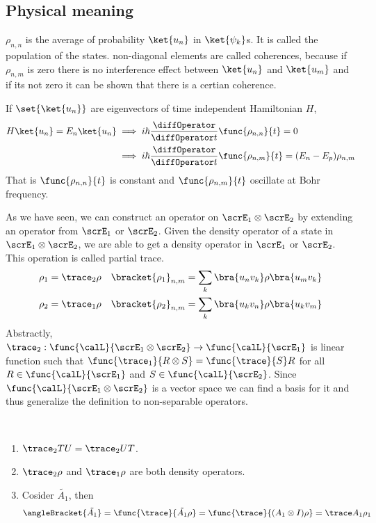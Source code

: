 \subsection{Physical meaning}
\(\rho_{n,n}\) is the average of probability \(\ket{u_n}\) in \(\ket{\psi_k}\)s. It is called the population of the states. non-diagonal elements are called coherences, because if \(\rho_{n,m}\) is zero there is no interference effect between \(\ket{u_n}\) and \(\ket{u_m}\) and if its not zero it can be shown that there is a certian coherence.

If \(\set{\ket{u_n}}\) are eigenvectors of time independent Hamiltonian \(H\),
\begin{align*}
    H \ket{u_n} = E_n \ket{u_n} & \implies  i\hbar \dfrac{\diffOperator}{\diffOperator t} \func{\rho_{n,n}}{t} =0                        \\
                                & \implies   i\hbar \dfrac{\diffOperator}{\diffOperator t} \func{\rho_{n,m}}{t} = (E_n - E_p) \rho_{n,m} 
\end{align*}
That is \(\func{\rho_{n,n}}{t}\) is constant and \(\func{\rho_{n,m}}{t}\) oscillate at Bohr frequency.

As we have seen, we can construct an operator on \(\scrE_1 \otimes \scrE_2\) by extending an operator from \(\scrE_1\) or \(\scrE_2\). Given the density operator of a state in \(\scrE_1 \otimes \scrE_2\), we are able to get a density operator in \(\scrE_1\) or \(\scrE_2\). This operation is called partial trace.
\begin{align*}
    \rho_1 & = \trace_2 \rho & \bracket{\rho_1}_{n,m} = \sum_{k} \bra{u_n v_k} \rho \bra{u_m v_k} \\
    \rho_2 & = \trace_1 \rho & \bracket{\rho_2}_{n,m} = \sum_{k} \bra{u_k v_n} \rho \bra{u_k v_m} 
\end{align*}
Abstractly, \(\trace_2: \func{\calL}{\scrE_1 \otimes \scrE_2} \to \func{\calL}{\scrE_1}\) is linear function such that \(\func{\trace_1}{R \otimes S} = \func{\trace}{S} R\) for all \(R \in \func{\calL}{\scrE_1}\) and \(S \in \func{\calL}{\scrE_2}\). Since \(\func{\calL}{\scrE_1 \otimes \scrE_2}\) is a vector space we can find a basis for it and thus generalize the definition to non-separable operators.
\begin{proposition}
    \
    \begin{enumerate}
        \item \(\trace_2 TU = \trace_2 UT\).
        \item \(\trace_2 \rho\) and \(\trace_1 \rho\) are both density operators.
        \item Cosider \(\tilde{A_1}\), then
              \begin{equation*}
                  \angleBracket{\tilde{A_1}} = \func{\trace}{\tilde{A_1} \rho} = \func{\trace}{(A_1 \otimes I) \rho} = \trace A_1 \rho_1
              \end{equation*}
    \end{enumerate}
\end{proposition}

